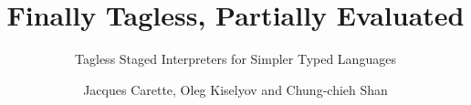 \documentclass{jfp}
\begin{document}
\title{Finally Tagless, Partially Evaluated}
\subtitle{Tagless Staged Interpreters for Simpler Typed Languages}
\author{Jacques Carette, Oleg Kiselyov and Chung-chieh Shan}
\def\draftnote{}

\maketitle

\end{document}
